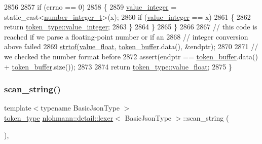 \begin{DoxyCode}
2856 
2857             \textcolor{keywordflow}{if} (errno == 0)
2858             \{
2859                 \hyperlink{classnlohmann_1_1detail_1_1lexer_a353d8eeca5b2f21b3e88540c17afb9bc}{value\_integer} = \textcolor{keyword}{static\_cast<}\hyperlink{classnlohmann_1_1detail_1_1lexer_a9cd1b11cc67edbfb2613c788b5bd337c}{number\_integer\_t}\textcolor{keyword}{>}(x);
2860                 \textcolor{keywordflow}{if} (\hyperlink{classnlohmann_1_1detail_1_1lexer_a353d8eeca5b2f21b3e88540c17afb9bc}{value\_integer} == x)
2861                 \{
2862                     \textcolor{keywordflow}{return} \hyperlink{classnlohmann_1_1detail_1_1lexer_a3f313cdbe187cababfc5e06f0b69b098a5064b6655d88a50ae16665cf7751c0ee}{token\_type::value\_integer};
2863                 \}
2864             \}
2865         \}
2866 
2867         \textcolor{comment}{// this code is reached if we parse a floating-point number or if an}
2868         \textcolor{comment}{// integer conversion above failed}
2869         \hyperlink{classnlohmann_1_1detail_1_1lexer_a1a2d4cc5d9fed4783aa2a98497925511}{strtof}(\hyperlink{classnlohmann_1_1detail_1_1lexer_a861ce804da2d257ee373d1e0b55780e1}{value\_float}, \hyperlink{classnlohmann_1_1detail_1_1lexer_aaa7a7bba826023ee34e9c99d51d55468}{token\_buffer}.data(), &endptr);
2870 
2871         \textcolor{comment}{// we checked the number format before}
2872         assert(endptr == \hyperlink{classnlohmann_1_1detail_1_1lexer_aaa7a7bba826023ee34e9c99d51d55468}{token\_buffer}.data() + \hyperlink{classnlohmann_1_1detail_1_1lexer_aaa7a7bba826023ee34e9c99d51d55468}{token\_buffer}.size());
2873 
2874         \textcolor{keywordflow}{return} \hyperlink{classnlohmann_1_1detail_1_1lexer_a3f313cdbe187cababfc5e06f0b69b098a0d2671a6f81efb91e77f6ac3bdb11443}{token\_type::value\_float};
2875     \}
\end{DoxyCode}
\mbox{\label{classnlohmann_1_1detail_1_1lexer_ad271045d1c91df9d6a119482b4aeae7f}} 
\subsubsection{\texorpdfstring{scan\+\_\+string()}{scan\_string()}}
{\footnotesize\ttfamily template$<$typename Basic\+Json\+Type $>$ \\
\hyperlink{classnlohmann_1_1detail_1_1lexer_a3f313cdbe187cababfc5e06f0b69b098}{token\+\_\+type} \hyperlink{classnlohmann_1_1detail_1_1lexer}{nlohmann\+::detail\+::lexer}$<$ Basic\+Json\+Type $>$\+::scan\+\_\+string (\begin{DoxyParamCaption}{ }\end{DoxyParamCaption})\hspace{0.3cm}{\ttfamily [inline]}, {\ttfamily [private]}}



